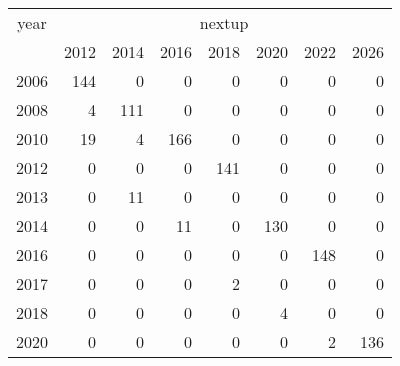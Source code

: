 \footnotesize\begin{tabular}[t]{lrrrrrrr}
\toprule
\multicolumn{1}{c}{year} & \multicolumn{7}{c}{nextup} \\
\cmidrule(l{3pt}r{3pt}){1-1} \cmidrule(l{3pt}r{3pt}){2-8}
  & 2012 & 2014 & 2016 & 2018 & 2020 & 2022 & 2026\\
\midrule
2006 & 144 & 0 & 0 & 0 & 0 & 0 & 0\\
2008 & 4 & 111 & 0 & 0 & 0 & 0 & 0\\
2010 & 19 & 4 & 166 & 0 & 0 & 0 & 0\\
2012 & 0 & 0 & 0 & 141 & 0 & 0 & 0\\
2013 & 0 & 11 & 0 & 0 & 0 & 0 & 0\\
2014 & 0 & 0 & 11 & 0 & 130 & 0 & 0\\
2016 & 0 & 0 & 0 & 0 & 0 & 148 & 0\\
2017 & 0 & 0 & 0 & 2 & 0 & 0 & 0\\
2018 & 0 & 0 & 0 & 0 & 4 & 0 & 0\\
2020 & 0 & 0 & 0 & 0 & 0 & 2 & 136\\
\bottomrule
\end{tabular}
